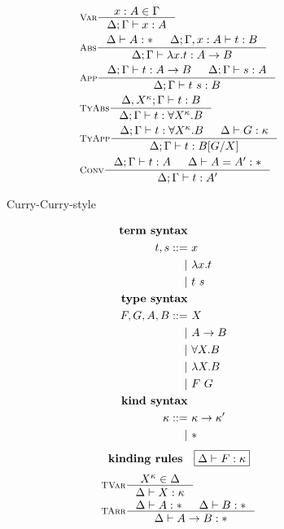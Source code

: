 \begin{figure}
\begin{singlespace}
\begin{minipage}{.46\textwidth}
\begin{align*}
& \inference[\sc Var]{x:A \in \Gamma}{\Delta;\Gamma |- x:A} \\
& \inference[\sc Abs]{\Delta |- A:* & \Delta;\Gamma,x:A |- t : B}
		     {\Delta;\Gamma |- \l x   .t : A -> B} \\
& \inference[\sc App]{\Delta;\Gamma |- t : A -> B & \Delta;\Gamma |- s : A}
		     {\Delta;\Gamma |- t~s : B} \\
& \inference[\sc TyAbs]{\Delta,X^\kappa;\Gamma |- t : B}
		       {\Delta;\Gamma |- t : \forall X^\kappa.B} \\
& \inference[\sc TyApp]{\Delta;\Gamma |- t : \forall X^\kappa.B & \Delta |- G:\kappa}
		       {\Delta;\Gamma |- t : B[G/X]} \\
& \inference[\sc Conv]{\Delta;\Gamma |- t : A & \Delta |- A = A' : *}
		      {\Delta;\Gamma |- t : A'}
\end{align*}
\end{minipage}
\begin{minipage}{.46\textwidth}
	\begin{center}Curry-Curry-style\end{center}
\def\baselinestretch{0}
\small
\begin{align*}
\textbf{term syntax} \\
t,s ::= &~ x           \\
      | &~ \lambda x    . t \\
      | &~ t ~ s       \\
\textbf{type syntax} \\
F,G,A,B ::= &~ X                  \\
          | &~ A -> B             \\   
          | &~ \forall X.B \\
          | &~ \lambda X.B      \\
          | &~ F ~ G              \\
\textbf{kind syntax} \\
\kappa ::= &~ \kappa -> \kappa'  \\
         | &~ *                  \\
\end{align*}
\[ \textbf{kinding rules} \quad \framebox{$ \Delta |- F:\kappa $} \]\vspace*{-1em}
\begin{align*}
& \inference[\sc TVar]{X^\kappa \in \Delta}{\Delta |- X:\kappa} \\
& \inference[\sc TArr]{\Delta |- A:* & \Delta |- B:*}{\Delta |- A -> B:*} \\

\end{align*}
\end{minipage}
\end{singlespace}
\end{figure}
